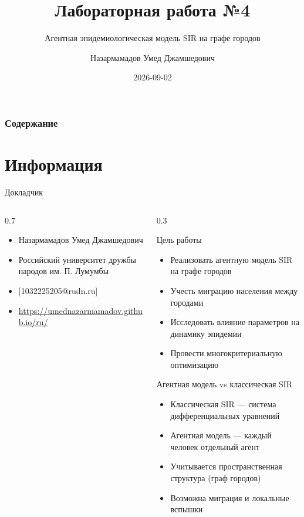 \documentclass[
  ignorenonframetext,
  aspectratio=169,
]{beamer}
\title{Лабораторная работа №4}
\subtitle{Агентная эпидемиологическая модель SIR на графе городов}
\author{Назармамадов Умед Джамшедович}
\date{2026-09-02}
\providecommand{\tightlist}{%
  \setlength{\itemsep}{0pt}\setlength{\parskip}{0pt}}\usepackage{longtable,booktabs,array}
\renewcommand*\contentsname{Содержание}
\newcommand\contentsname{Содержание}
\begin{document}
\frame{\titlepage}

\renewcommand*\contentsname{Содержание}
\begin{frame}[allowframebreaks]
  \frametitle{Содержание}
  \tableofcontents[hideallsubsections]
\end{frame}

\section{Информация}\label{ux438ux43dux444ux43eux440ux43cux430ux446ux438ux44f}

\begin{frame}{Докладчик}
\label{ux434ux43eux43aux43bux430ux434ux447ux438ux43a}
\begin{columns}[c]
\begin{column}{0.7\textwidth}
\begin{itemize}[<+->]
\tightlist
\item
  Назармамадов Умед Джамшедович
\item
  Российский университет дружбы народов им. П. Лумумбы
\item
  {[}1032225205@rudn.ru{]}
\item
  \url{https://umednazarmamadov.github.io/ru/}
\end{itemize}
\end{column}

\begin{column}{0.3\textwidth}
\begin{frame}{Цель работы}
\label{ux446ux435ux43bux44c-ux440ux430ux431ux43eux442ux44b}
\begin{itemize}[<+->]
\tightlist
\item
  Реализовать агентную модель SIR на графе городов
\item
  Учесть миграцию населения между городами
\item
  Исследовать влияние параметров на динамику эпидемии
\item
  Провести многокритериальную оптимизацию
\end{itemize}
\end{frame}

\begin{frame}{Агентная модель vs классическая SIR}
\label{ux430ux433ux435ux43dux442ux43dux430ux44f-ux43cux43eux434ux435ux43bux44c-vs-ux43aux43bux430ux441ux441ux438ux447ux435ux441ux43aux430ux44f-sir}
\begin{itemize}[<+->]
\tightlist
\item
  Классическая SIR --- система дифференциальных уравнений
\item
  Агентная модель --- каждый человек отдельный агент
\item
  Учитывается пространственная структура (граф городов)
\item
  Возможна миграция и локальные вспышки
\end{itemize}
\end{frame}


\end{column}
\end{columns}
\end{frame}
\end{document}
